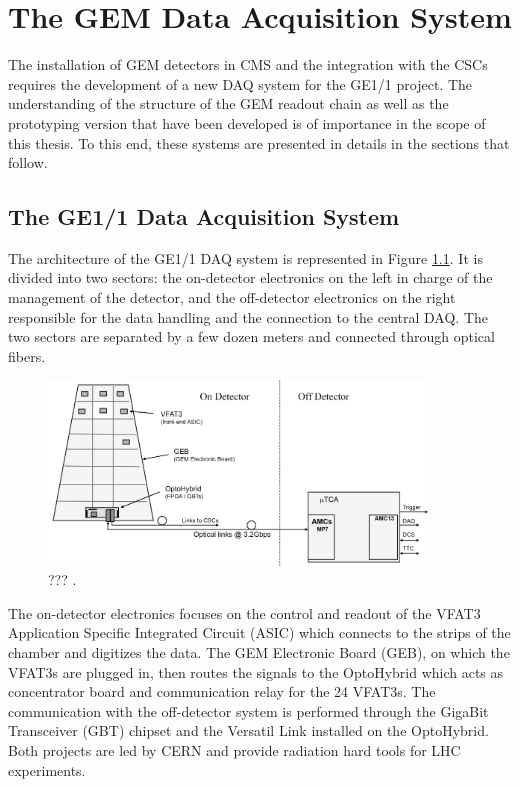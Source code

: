\chapter{The GEM Data Acquisition System}
\label{chap:II-2-daq}

  The installation of GEM detectors in CMS and the integration with the CSCs requires the development of a new DAQ system for the GE1/1 project. The understanding of the structure of the GEM readout chain as well as the prototyping version that have been developed is of importance in the scope of this thesis. To this end, these systems are presented in details in the sections that follow. \\

  \section{The GE1/1 Data Acquisition System}

    The architecture of the GE1/1 DAQ system is represented in Figure \ref{fig:II-2-gem-system}. It is divided into two sectors: the on-detector electronics on the left in charge of the management of the detector, and the off-detector electronics on the right responsible for the data handling and the connection to the central DAQ. The two sectors are separated by a few dozen meters and connected through optical fibers. \\

    \begin{figure}[h!]
      \centering
      \includegraphics[width=0.9\textwidth]{img/II-2-daq/gem-system.pdf}
      \caption{??? \cite{Colaleo:2021453}.}
      \label{fig:II-2-gem-system}
    \end{figure}

    The on-detector electronics focuses on the control and readout of the VFAT3 Application Specific Integrated Circuit (ASIC) which connects to the strips of the chamber and digitizes the data. The GEM Electronic Board (GEB), on which the VFAT3s are plugged in, then routes the signals to the OptoHybrid which acts as concentrator board and communication relay for the 24 VFAT3s. The communication with the off-detector system is performed through the GigaBit Transceiver (GBT) chipset and the Versatil Link installed on the OptoHybrid. Both projects are led by CERN and provide radiation hard tools for LHC experiments. \\

